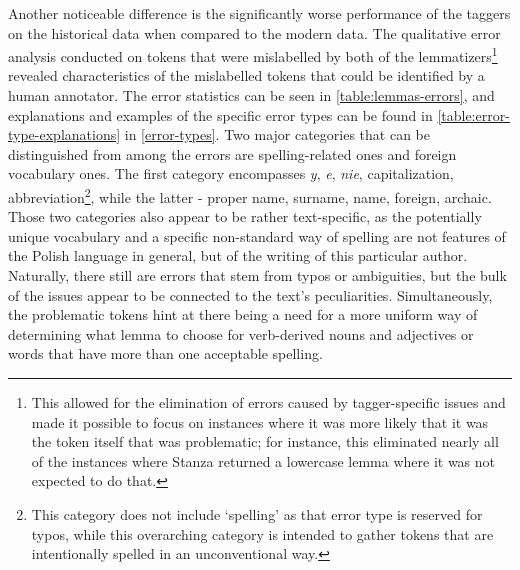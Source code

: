 Another noticeable difference is the significantly worse performance of the taggers on the historical data when compared to the modern data. The qualitative error analysis conducted on tokens that were mislabelled by both of the lemmatizers\footnote{This allowed for the elimination of errors caused by tagger-specific issues and made it possible to focus on instances where it was more likely that it was the token itself that was problematic; for instance, this eliminated nearly all of the instances where Stanza returned a lowercase lemma where it was not expected to do that.} revealed characteristics of the mislabelled tokens that could be identified by a human annotator. The error statistics can be seen in \autoref{table:lemmas-errors}, and explanations and examples of the specific error types can be found in \autoref{table:error-type-explanations} in \autoref{error-types}. Two major categories that can be distinguished from among the errors are spelling-related ones and foreign vocabulary ones. The first category encompasses \textit{y}, \textit{e}, \textit{nie}, capitalization, abbreviation\footnote{This category does not include `spelling' as that error type is reserved for typos, while this overarching category is intended to gather tokens that are intentionally spelled in an unconventional way.}, while the latter - proper name, surname, name, foreign, archaic. Those two categories also appear to be rather text-specific, as the potentially unique vocabulary and a specific non-standard way of spelling are not features of the Polish language in general, but of the writing of this particular author. Naturally, there still are errors that stem from typos or ambiguities, but the bulk of the issues appear to be connected to the text's peculiarities. Simultaneously, the problematic tokens hint at there being a need for a more uniform way of determining what lemma to choose for verb-derived nouns and adjectives or words that have more than one acceptable spelling.

